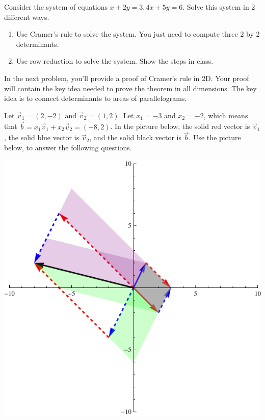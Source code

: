 \begin{problem}
 Consider the system of equations $x+2y=3, 4x+5y=6$. Solve this system in 2 different ways.
\begin{enumerate}
 \item Use Cramer's rule to solve the system. You just need to compute three 2 by 2 determinants.
 \item Use row reduction to solve the system. Show the steps in class. 
\end{enumerate}
\end{problem}

In the next problem, you'll provide a proof of Cramer's rule in 2D. Your proof will contain the key idea needed to prove the theorem in all dimensions. The key idea is to connect determinants to areas of parallelograms.  
\begin{problem}
Let $\vec v_1 = (2,-2)$ and $\vec v_2 = (1,2)$. Let $x_1=-3$ and $x_2 = -2$, which means that $\vec b = x_1\vec v_1+x_2\vec v_2=(-8,2)$. In the picture below, the solid red vector is $\vec v_1$, the solid blue vector is $\vec v_2$, and the solid black vector is $\vec b$. Use the picture below, to answer the following questions.

\includegraphics{cramers-visual}


\end{problem}
